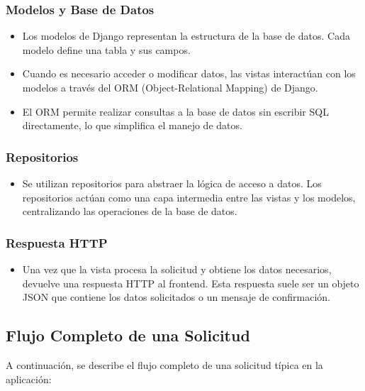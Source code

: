\documentclass{report}
\begin{document}
    \subsubsection*{Modelos y Base de Datos}
    \begin{itemize}
        \item Los modelos de Django representan la estructura de la base de datos. Cada modelo define una tabla y sus campos.
        \item Cuando es necesario acceder o modificar datos, las vistas interactúan con los modelos a través del ORM (Object-Relational Mapping) de Django.
        \item El ORM permite realizar consultas a la base de datos sin escribir SQL directamente, lo que simplifica el manejo de datos.
    \end{itemize}
    
    \subsubsection*{Repositorios}
    \begin{itemize}
        \item Se utilizan repositorios para abstraer la lógica de acceso a datos. Los repositorios actúan como una capa intermedia entre las vistas y los modelos, centralizando las operaciones de la base de datos.
    \end{itemize}
    
    \subsubsection*{Respuesta HTTP}
    \begin{itemize}
        \item Una vez que la vista procesa la solicitud y obtiene los datos necesarios, devuelve una respuesta HTTP al frontend. Esta respuesta suele ser un objeto JSON que contiene los datos solicitados o un mensaje de confirmación.
    \end{itemize}
    
    \subsection*{Flujo Completo de una Solicitud}
    A continuación, se describe el flujo completo de una solicitud típica en la aplicación:
    
\end{document}
